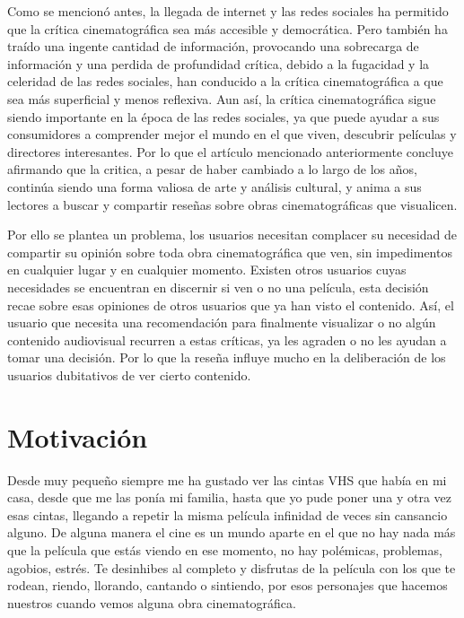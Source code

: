 Como se mencionó antes, la llegada de internet y las redes sociales ha permitido que la crítica 
cinematográfica sea más accesible y democrática. Pero también ha traído una ingente cantidad de 
información, provocando una sobrecarga de información y una perdida de profundidad crítica, debido a la 
fugacidad y la celeridad de las redes sociales, han conducido a la crítica cinematográfica a que sea 
más superficial y menos reflexiva. Aun así, la crítica cinematográfica sigue siendo importante en la 
época de las redes sociales, ya que puede ayudar a sus consumidores a comprender mejor el mundo en el 
que viven, descubrir películas y directores interesantes. Por lo que el artículo mencionado 
anteriormente concluye afirmando que la critica, a pesar de haber cambiado a lo largo de los años, 
continúa siendo una forma valiosa de arte y análisis cultural, y anima a sus lectores a buscar y 
compartir reseñas sobre obras cinematográficas que visualicen.

Por ello se plantea un problema, los usuarios necesitan complacer su necesidad de compartir su opinión 
sobre toda obra cinematográfica que ven, sin impedimentos en cualquier lugar y en cualquier momento. 
Existen otros usuarios cuyas necesidades se encuentran en discernir si ven o no una película, esta 
decisión recae sobre esas opiniones de otros usuarios que ya han visto el contenido. Así, el usuario 
que necesita una recomendación para finalmente visualizar o no algún contenido audiovisual recurren a 
estas críticas, ya les agraden o no les ayudan a tomar una decisión. Por lo que la reseña influye mucho 
en la deliberación de los usuarios dubitativos de ver cierto contenido.

\section{Motivación}

Desde muy pequeño siempre me ha gustado ver las cintas VHS que había en mi casa, desde que me las ponía 
mi familia, hasta que yo pude poner una y otra vez esas cintas, llegando a repetir la misma película 
infinidad de veces sin cansancio alguno. De alguna manera el cine es un mundo aparte en el que no hay 
nada más que la película que estás viendo en ese momento, no hay polémicas, problemas, agobios, estrés. 
Te desinhibes al completo y disfrutas de la película con los que te rodean, riendo, llorando, cantando 
o sintiendo, por esos personajes que hacemos nuestros cuando vemos alguna obra cinematográfica. 

